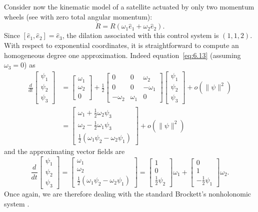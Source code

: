 \documentclass[11pt]{article}
\begin{document}
Consider now the kinematic model of a satellite actuated by only two momentum wheels (see \cite{23} with zero total angular momentum):
\begin{equation*}
\dot R=R(\omega_1\widehat e_1+\omega_2\widehat e_2).
\end{equation*}
Since $[\widehat e_1,\widehat e_2]=\widehat e_3$, the dilation associated with this control system is $(1,1,2)$. With respect to exponential coordinates, it is straightforward to compute an homogeneous degree one approximation. Indeed equation~\eqref{eq:6.13} (assuming $\omega_3=0$) as
\begin{align*}
\frac{d}{dt}\begin{bmatrix}\psi_1\\\psi_2\\\psi_3\end{bmatrix}
&=\begin{bmatrix}\omega_1\\\omega_2\\0\end{bmatrix}
+\frac12\begin{bmatrix}0&0&\omega_2\\0&0&-\omega_1\\-\omega_2&\omega_1&0\end{bmatrix}
\begin{bmatrix}\psi_1\\\psi_2\\\psi_3\end{bmatrix}+o(\|\psi\|^2)\\
&=\begin{bmatrix}\omega_1+\tfrac12\omega_2\psi_3\\\omega_2-\tfrac12\omega_1\psi_3\\\tfrac12(\omega_1\psi_2-\omega_2\psi_1)\end{bmatrix}+o(\|\psi\|^2)
\end{align*}
and the approximating vector fields are
\begin{equation*}
\frac{d}{dt}\begin{bmatrix}\psi_1\\\psi_2\\\psi_3\end{bmatrix}
=\begin{bmatrix}\omega_1\\\omega_2\\\tfrac12(\omega_1\psi_2-\omega_2\psi_1)\end{bmatrix}
=\begin{bmatrix}1\\0\\\tfrac12\psi_2\end{bmatrix}\omega_1+
\begin{bmatrix}0\\1\\-\tfrac12\psi_1\end{bmatrix}\omega_2.\tag{6.14}\label{eq:6.14}
\end{equation*}
Once again, we are therefore dealing with the standard Brockett's nonholonomic system \cite{6}.
\end{document}
